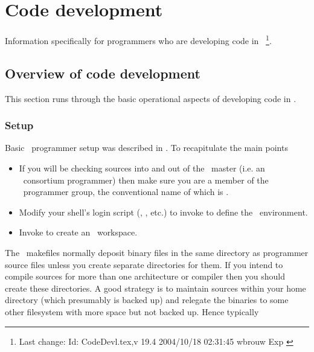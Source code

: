 \chapter{Code development}
\label{Code development}

Information specifically for programmers who are developing code in \aipspp\ 
\footnote{Last change:
$ $Id: CodeDevl.tex,v 19.4 2004/10/18 02:31:45 wbrouw Exp $ $}.


\section{Overview of code development}
\label{Overview of code development}

This section runs through the basic operational aspects of developing code in
\aipspp.

\subsection*{Setup}

Basic \aipspp\ programmer setup was described in \sref{AIPS++ programmer
setup}.  To recapitulate the main points
\begin{itemize}
\item
   If you will be checking sources into and out of the \aipspp\ master (i.e.
   an \aipspp\ consortium programmer) then make sure you are a member of the
   \aipspp\ programmer group, the conventional name of which is
   .

\item
   Modify your shell's login script (, , etc.) to
   invoke \exeref{aipsinit} to define the \aipspp\ environment.

\item
   Invoke  to create an \aipspp\ workspace.
\end{itemize}

The \aipspp\ makefiles normally deposit binary files in the same directory as
programmer source files unless you create separate directories for them.  If
you intend to compile sources for more than one architecture or compiler then
you should create these directories.  A good strategy is to maintain sources
within your home directory (which presumably is backed up) and relegate the
binaries to some other filesystem with more space but not backed up.  Hence
typically

